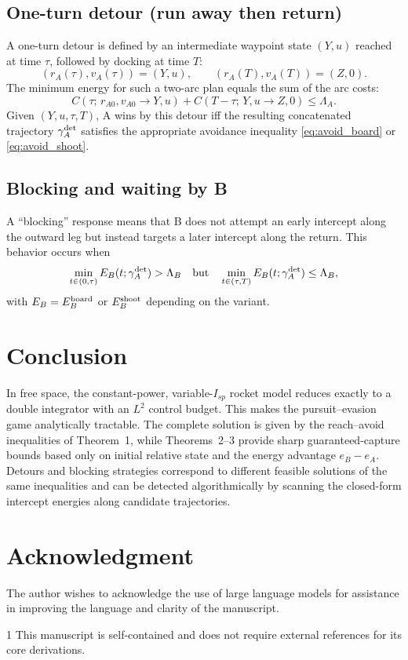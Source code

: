 \documentclass[journal, a4paper]{IEEEtran}
\begin{document}
\subsection{One-turn detour (run away then return)}
A one-turn detour is defined by an intermediate waypoint state $(Y,u)$ reached at time $\tau$, followed by docking at time $T$:
\begin{equation}
(r_A(\tau),v_A(\tau))=(Y,u),\qquad (r_A(T),v_A(T))=(Z,0).
\end{equation}
The minimum energy for such a two-arc plan equals the sum of the arc costs:
\begin{equation}
C\!\left(\tau;\,r_{A0},v_{A0}\!\to Y,u\right)
+
C\!\left(T-\tau;\,Y,u\!\to Z,0\right)
\le \Lambda_A.
\label{eq:detour_feasible}
\end{equation}
Given $(Y,u,\tau,T)$, A wins by this detour iff the resulting concatenated trajectory $\gamma_A^{\rm det}$ satisfies the appropriate avoidance inequality \eqref{eq:avoid_board} or \eqref{eq:avoid_shoot}.

\subsection{Blocking and waiting by B}
A ``blocking'' response means that B does not attempt an early intercept along the outward leg but instead targets a later intercept along the return.
This behavior occurs when
\begin{equation}
\min_{t\in(0,\tau)} E_B(t;\gamma_A^{\rm det})>\Lambda_B
\quad\text{but}\quad
\min_{t\in(\tau,T)} E_B(t;\gamma_A^{\rm det})\le\Lambda_B,
\label{eq:block_condition}
\end{equation}
with $E_B=E_B^{\rm board}$ or $E_B^{\rm shoot}$ depending on the variant.

\section{Conclusion}
In free space, the constant-power, variable-$I_{\!sp}$ rocket model reduces exactly to a double integrator with an $L^2$ control budget.
This makes the pursuit--evasion game analytically tractable.
The complete solution is given by the reach--avoid inequalities of Theorem~1, while Theorems~2--3 provide sharp guaranteed-capture bounds based only on initial relative state and the energy advantage $e_B-e_A$.
Detours and blocking strategies correspond to different feasible solutions of the same inequalities and can be detected algorithmically by scanning the closed-form intercept energies along candidate trajectories.

\section*{Acknowledgment}
The author wishes to acknowledge the use of large language models for assistance in improving the language and clarity of the manuscript.


\begin{thebibliography}{1}
This manuscript is self-contained and does not require external references for its core derivations.
\end{thebibliography}
\end{document}
